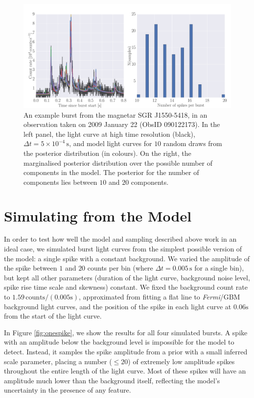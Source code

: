 \documentclass[12pt]{emulateapj}
\newcommand{\project}[1]{\textsl{#1}}
\newcommand{\fermi}{\project{Fermi}}
\begin{document}
\begin{figure}[htbp]
\includegraphics[width=\textwidth]{f4.pdf}%
\caption{An example burst from the magnetar SGR J1550-5418, in an observation taken on 2009 January 22 (ObsID 090122173). In the left
panel, the light curve at high time resolution (black), $\Delta t = 5 \times 10^{-4}\,\mathrm{s}$, and model light curves for $10$ random draws from the posterior distribution (in colours). 
On the right, the marginalised posterior distribution over the possible number of components in the model. The posterior for the number of components lies between $10$ and $20$ components.}
\label{fig:dnest_example}
\end{figure}


\section{Simulating from the Model}
\label{ch6:modelsims}

In order to test how well the model and sampling described above work in an ideal case, we simulated burst light curves from the simplest possible version
of the model: a single spike with a constant background. We varied the amplitude of the spike between $1$ and $20$ counts per bin (where $\Delta t = 0.005\,\mathrm{s}$ for
a single bin), but kept all other parameters (duration of the light curve, background noise level, spike rise time scale and skewness) constant. 
We fixed the background count rate to $1.59\,\mathrm{counts}/(0.005\mathrm{s})$, approximated from fitting a flat line to \fermi/GBM background light curves, and the position
of the spike in each light curve at $0.06\mathrm{s}$ from the start of the light curve.

In Figure \ref{fig:onespike}, we show the results for all four simulated bursts. A spike with an amplitude below the background level is impossible for the model
to detect. Instead, it samples the spike amplitude from a prior with a small inferred scale parameter, placing a number ($\leq 20$) of extremely low amplitude spikes throughout the entire length of the light curve. Most of these spikes will have an amplitude much lower than the background itself, reflecting the model's uncertainty in the presence of any feature. 
\end{document}
